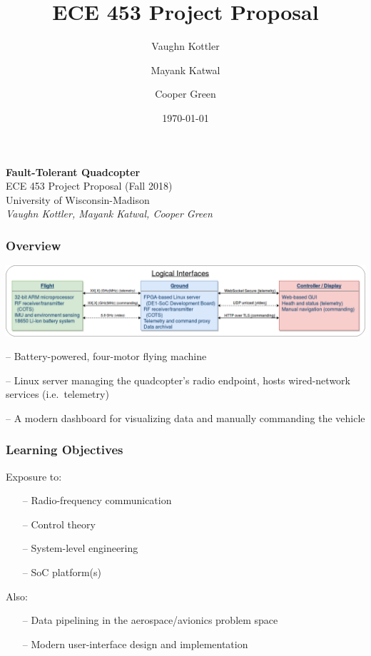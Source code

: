 \documentclass{beamer}
\title{ECE 453 Project Proposal}
\author{Vaughn Kottler}
\author{Mayank Katwal}
\author{Cooper Green}
\date{\today}
\begin{document}
\begin{frame}
\begin{center}
{\Large\textbf{Fault-Tolerant Quadcopter}}\\
\vspace{\baselineskip}
ECE 453 Project Proposal (Fall 2018)\\
University of Wisconsin-Madison\\
\vspace{\baselineskip}
{\large\textit{Vaughn Kottler, Mayank Katwal, Cooper Green}}
\end{center}
\end{frame}

\begin{frame}
\frametitle{Overview}
\begin{center}
\includegraphics[width=\linewidth]{../src/im/top_level}
\end{center}
\vspace{\baselineskip}
\begin{description}[align=right,labelwidth=80pt,itemsep=10pt]
\item [Quadcopter] -- Battery-powered, four-motor flying machine
\item [Ground Station] -- Linux server managing the quadcopter's
	radio endpoint, hosts wired-network services (i.e.\ telemetry)
\item [Web-based UI] -- A modern dashboard for visualizing data
	and manually commanding the vehicle
\end{description}
\end{frame}

\begin{frame}

\frametitle{Learning Objectives}

Exposure to:
\begin{itemize}[itemsep=10pt]
	\item [--] Radio-frequency communication
	\item [--] Control theory
	\item [--] System-level engineering
	\item [--] SoC platform(s)
\end{itemize}

\vspace{\baselineskip}

Also:
\begin{itemize}[itemsep=10pt]
	\item [--] Data pipelining in the aerospace/avionics problem space
	\item [--] Modern user-interface design and implementation
\end{itemize}

\end{frame}
\end{document}
